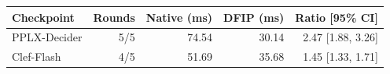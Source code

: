 \begin{tabular}{lrrrr}
\toprule
Checkpoint & Rounds & Native (ms) & DFIP (ms) & Ratio [95\% CI] \\
\midrule
PPLX-Decider & 5/5 & 74.54 & 30.14 & 2.47 [1.88, 3.26] \\
Clef-Flash & 4/5 & 51.69 & 35.68 & 1.45 [1.33, 1.71] \\
\bottomrule
\end{tabular}
